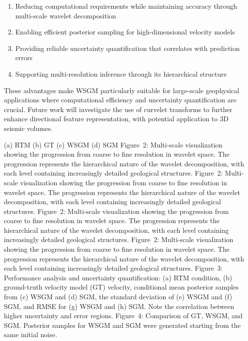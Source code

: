 \documentclass{IMAGE2025}
\begin{document}
\begin{enumerate}
\def\labelenumi{\arabic{enumi}.}
\tightlist
\item
  Reducing computational requirements while maintaining accuracy through
  multi-scale wavelet decomposition
\item
  Enabling efficient posterior sampling for high-dimensional velocity
  models\\
\item
  Providing reliable uncertainty quantification that correlates with
  prediction errors
\item
  Supporting multi-resolution inference through its hierarchical
  structure
\end{enumerate}

These advantages make WSGM particularly suitable for large-scale
geophysical applications where computational efficiency and uncertainty
quantification are crucial. Future work will investigate the use of
curvelet transforms to further enhance directional feature
representation, with potential application to 3D seismic volumes.

{(a) RTM} {(b) GT} {(c) WSGM} {(d) SGM} {Figure~2: Multi-scale
visualization showing the progression from coarse to fine resolution in
wavelet space. The progression represents the hierarchical nature of the
wavelet decomposition, with each level containing increasingly detailed
geological structures.} {Figure~2: Multi-scale visualization showing the
progression from coarse to fine resolution in wavelet space. The
progression represents the hierarchical nature of the wavelet
decomposition, with each level containing increasingly detailed
geological structures.} {Figure~2: Multi-scale visualization showing the
progression from coarse to fine resolution in wavelet space. The
progression represents the hierarchical nature of the wavelet
decomposition, with each level containing increasingly detailed
geological structures.} {Figure~2: Multi-scale visualization showing the
progression from coarse to fine resolution in wavelet space. The
progression represents the hierarchical nature of the wavelet
decomposition, with each level containing increasingly detailed
geological structures.} {Figure~3: Performance analysis and uncertainty
quantification: (a) RTM condition, (b) ground-truth velocity model (GT)
velocity, conditional mean posterior samples from (c) WSGM and (d) SGM,
the standard deviation of (e) WSGM and (f) SGM, and RMSE for (g) WSGM
and (h) SGM. Note the correlation between higher uncertainty and error
regions.} {Figure~4: Comparison of GT, WSGM, and SGM. Posterior samples
for WSGM and SGM were generated starting from the same initial noise.}
\end{document}
